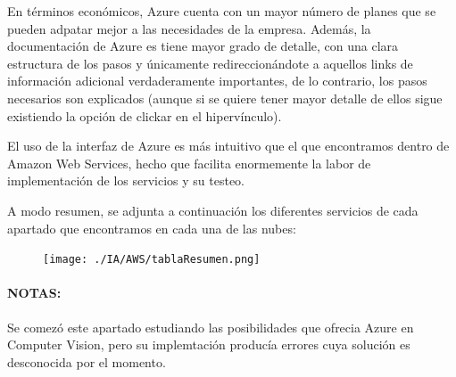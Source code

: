 \documentclass[english,runningheads,a4paper]{llncs}[2018/03/10]
\begin{document}
    En términos económicos, Azure cuenta con un mayor número de planes que se 
    pueden adpatar mejor a las necesidades de la empresa. Además, la 
    documentación de Azure es tiene mayor grado de detalle, con una clara 
    estructura de los pasos y únicamente redireccionándote a aquellos links de 
    información adicional verdaderamente importantes, de lo contrario, los 
    pasos necesarios son explicados (aunque si se quiere tener mayor detalle de 
    ellos sigue existiendo la opción de clickar en el hipervínculo).
    
    El uso de la interfaz de Azure es más intuitivo que el que encontramos 
    dentro de Amazon Web Services, hecho que facilita enormemente la labor de 
    implementación de los servicios y su testeo.
    
    A modo resumen, se adjunta a continuación los diferentes servicios de cada 
    apartado que encontramos en cada una de las nubes:
    
    \begin{figure}[h!]
        \centering
        \texttt{[image: ./IA/AWS/tablaResumen.png]}
        \caption{}
    \end{figure}
    
    
    \paragraph{NOTAS:} Se comezó este apartado estudiando las posibilidades que ofrecia Azure en Computer Vision, pero su implemtación producía errores cuya solución es desconocida por el momento.
    

    
    \newpage
\end{document}
